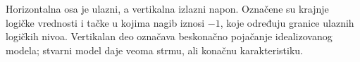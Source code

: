 
Horizontalna osa je ulazni, a vertikalna izlazni napon. Označene su krajnje logičke vrednosti i tačke u kojima nagib iznosi $-1$, koje određuju granice ulaznih logičkih nivoa. Vertikalan deo označava beskonačno pojačanje idealizovanog modela; stvarni model daje veoma strmu, ali konačnu karakteristiku.
